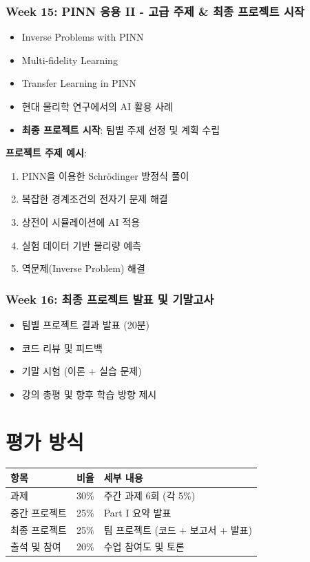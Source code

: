 \documentclass[11pt,a4paper]{article}
\begin{document}
\subsubsection*{Week 15: PINN 응용 II - 고급 주제 \& 최종 프로젝트 시작}
\begin{itemize}[noitemsep]
    \item Inverse Problems with PINN
    \item Multi-fidelity Learning
    \item Transfer Learning in PINN
    \item 현대 물리학 연구에서의 AI 활용 사례
    \item \textbf{최종 프로젝트 시작}: 팀별 주제 선정 및 계획 수립
\end{itemize}

\textbf{프로젝트 주제 예시}:
\begin{enumerate}[noitemsep]
    \item PINN을 이용한 Schrödinger 방정식 풀이
    \item 복잡한 경계조건의 전자기 문제 해결
    \item 상전이 시뮬레이션에 AI 적용
    \item 실험 데이터 기반 물리량 예측
    \item 역문제(Inverse Problem) 해결
\end{enumerate}

\subsubsection*{Week 16: 최종 프로젝트 발표 및 기말고사}
\begin{itemize}[noitemsep]
    \item 팀별 프로젝트 결과 발표 (20분)
    \item 코드 리뷰 및 피드백
    \item 기말 시험 (이론 + 실습 문제)
    \item 강의 총평 및 향후 학습 방향 제시
\end{itemize}

\newpage

\section{평가 방식}

\begin{table}[h]
\centering
\begin{tabular}{@{}lll@{}}
\toprule
\textbf{항목} & \textbf{비율} & \textbf{세부 내용} \\ \midrule
과제 & 30\% & 주간 과제 6회 (각 5\%) \\
중간 프로젝트 & 25\% & Part I 요약 발표 \\
최종 프로젝트 & 25\% & 팀 프로젝트 (코드 + 보고서 + 발표) \\
출석 및 참여 & 20\% & 수업 참여도 및 토론 \\ \bottomrule
\end{tabular}
\end{table}
\end{document}
